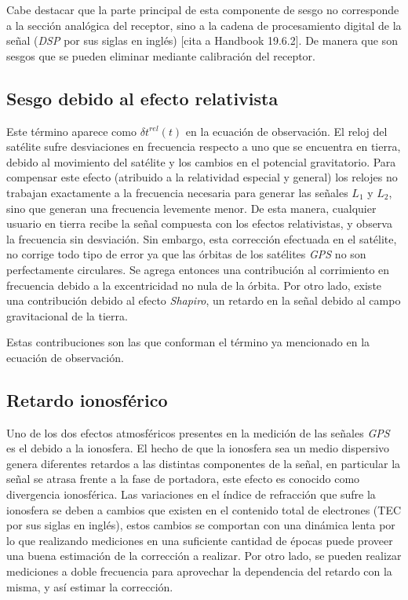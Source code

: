 \documentclass[a4paper,12pt,oneside,onecolumn,final,openright]{book}%
\begin{document}
	 Cabe destacar que la parte principal de esta componente de sesgo no corresponde a la sección analógica del receptor, sino a la cadena de procesamiento digital de la señal (\textit{DSP} por sus siglas en inglés) [cita a Handbook 19.6.2]. De manera que son sesgos que se pueden eliminar mediante calibración del receptor.
	 
\subsection{Sesgo debido al efecto relativista}
	Este término aparece como $\delta t^{rel}(t)$ en la ecuación de observación. El reloj del satélite sufre desviaciones en frecuencia respecto a uno que se encuentra en tierra, debido al movimiento del satélite y los cambios en el potencial gravitatorio. Para compensar este efecto (atribuido a la relatividad especial y general) los relojes no trabajan exactamente a la frecuencia necesaria para generar las señales $L_1$ y $L_2$, sino que generan una frecuencia levemente menor. De esta manera, cualquier usuario en tierra recibe la señal compuesta con los efectos relativistas, y observa la frecuencia sin desviación. Sin embargo, esta corrección efectuada en el satélite, no corrige todo tipo de error ya que las órbitas de los satélites \textit{GPS} no son perfectamente circulares. Se agrega entonces una contribución al corrimiento en frecuencia debido a la excentricidad no nula de la órbita. Por otro lado, existe una contribución debido al efecto \textit{Shapiro}, un retardo en la señal debido al campo gravitacional de la tierra. 
	
	 Estas contribuciones son las que conforman el término ya mencionado en la ecuación de observación. 
	 
\subsection{Retardo ionosférico}
	Uno de los dos efectos atmosféricos presentes en la medición de las señales \textit{GPS} es el debido a la ionosfera. El hecho de que la ionosfera sea un medio dispersivo genera diferentes retardos a las distintas componentes de la señal, en particular la señal se atrasa frente a la fase de portadora, este efecto es conocido como divergencia ionosférica. Las variaciones en el índice de refracción que sufre la ionosfera se deben a cambios que existen en el contenido total de electrones (TEC por sus siglas en inglés), estos cambios se comportan con una dinámica lenta por lo que realizando mediciones en una suficiente cantidad de épocas puede proveer una buena estimación de la corrección a realizar. Por otro lado, se pueden realizar mediciones a doble frecuencia para aprovechar la dependencia del retardo con la misma, y así estimar la corrección. 
	
\end{document}
